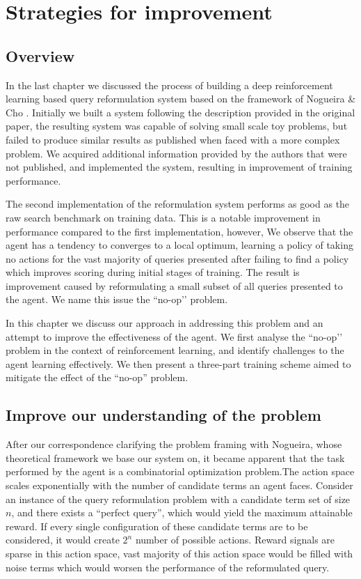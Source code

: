 \chapter{Strategies for improvement}
\label{chap:improving the system}


\section{Overview}

In the last chapter we discussed the process of building a deep reinforcement learning based query reformulation system based on the framework of Nogueira \& Cho \cite{nogueira2017task}. Initially we built a system following the description provided in the original paper, the resulting system was capable of solving small scale toy problems, but failed to produce similar results as published when faced with a more complex problem. We acquired additional information provided by the authors that were not published, and implemented the system, resulting in improvement of training performance. 

The second implementation of the reformulation system performs as good as the raw search benchmark on training data. This is a notable improvement in performance compared to the first implementation, however, We observe that the agent has a tendency to converges to a local optimum, learning a policy of taking no actions for the vast majority of queries presented after failing to find a policy which improves scoring during initial stages of training. The result is improvement caused by reformulating a small subset of all queries presented to the agent. We name this issue the ``no-op’’ problem. 

In this chapter we discuss our approach in addressing this problem and an attempt to improve the effectiveness of the agent. We first analyse the ``no-op’’ problem in the context of reinforcement learning, and identify challenges to the agent learning effectively. We then present  a three-part training scheme aimed to mitigate the effect of the ``no-op'' problem.  


\section{Improve our understanding of the problem}


After our correspondence clarifying the problem framing with Nogueira, whose theoretical framework we base our system on, it became apparent that the task performed by the agent is a combinatorial optimization problem.The action space scales exponentially with the number of candidate terms an agent faces. Consider an instance of the query reformulation problem with a candidate term set of size $n$, and there exists a ``perfect query'', which would yield the maximum attainable reward. If every single configuration of these candidate terms are to be considered, it would create $2^{n}$ number of possible actions. Reward signals are sparse in this action space, vast majority of this action space would be filled with noise terms which would worsen the performance of the reformulated query.  

